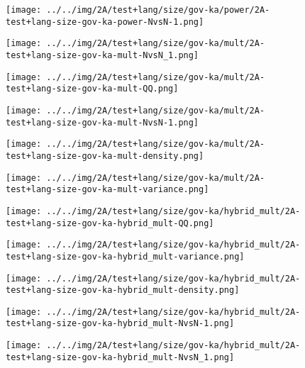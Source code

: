 \begin{figure}[H]
\centering	\texttt{[image: ../../img/2A/test+lang/size/gov-ka/power/2A-test+lang-size-gov-ka-power-NvsN-1.png]}
\end{figure}
\begin{figure}[H]
\centering	\texttt{[image: ../../img/2A/test+lang/size/gov-ka/mult/2A-test+lang-size-gov-ka-mult-NvsN\_1.png]}
\end{figure}
\begin{figure}[H]
\centering	\texttt{[image: ../../img/2A/test+lang/size/gov-ka/mult/2A-test+lang-size-gov-ka-mult-QQ.png]}
\end{figure}
\begin{figure}[H]
\centering	\texttt{[image: ../../img/2A/test+lang/size/gov-ka/mult/2A-test+lang-size-gov-ka-mult-NvsN-1.png]}
\end{figure}
\begin{figure}[H]
\centering	\texttt{[image: ../../img/2A/test+lang/size/gov-ka/mult/2A-test+lang-size-gov-ka-mult-density.png]}
\end{figure}
\begin{figure}[H]
\centering	\texttt{[image: ../../img/2A/test+lang/size/gov-ka/mult/2A-test+lang-size-gov-ka-mult-variance.png]}
\end{figure}
\begin{figure}[H]
\centering	\texttt{[image: ../../img/2A/test+lang/size/gov-ka/hybrid\_mult/2A-test+lang-size-gov-ka-hybrid\_mult-QQ.png]}
\end{figure}
\begin{figure}[H]
\centering	\texttt{[image: ../../img/2A/test+lang/size/gov-ka/hybrid\_mult/2A-test+lang-size-gov-ka-hybrid\_mult-variance.png]}
\end{figure}
\begin{figure}[H]
\centering	\texttt{[image: ../../img/2A/test+lang/size/gov-ka/hybrid\_mult/2A-test+lang-size-gov-ka-hybrid\_mult-density.png]}
\end{figure}
\begin{figure}[H]
\centering	\texttt{[image: ../../img/2A/test+lang/size/gov-ka/hybrid\_mult/2A-test+lang-size-gov-ka-hybrid\_mult-NvsN-1.png]}
\end{figure}
\begin{figure}[H]
\centering	\texttt{[image: ../../img/2A/test+lang/size/gov-ka/hybrid\_mult/2A-test+lang-size-gov-ka-hybrid\_mult-NvsN\_1.png]}
\end{figure}
